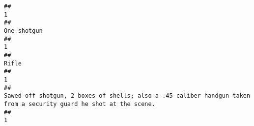 \documentclass[
]{article}
\begin{document}
\begin{verbatim}
##                                                                                                                                                                                                                                                                                                                                                                                                     1 
##                                                                                                                                                                                                                                                                                                                                                                                           One shotgun 
##                                                                                                                                                                                                                                                                                                                                                                                                     1 
##                                                                                                                                                                                                                                                                                                                                                                                                 Rifle 
##                                                                                                                                                                                                                                                                                                                                                                                                     1 
##                                                                                                                                                                                                                                                                                    Sawed-off shotgun, 2 boxes of shells; also a .45-caliber handgun taken from a security guard he shot at the scene. 
##                                                                                                                                                                                                                                                                                                                                                                                                     1 

\end{verbatim}
\end{document}
